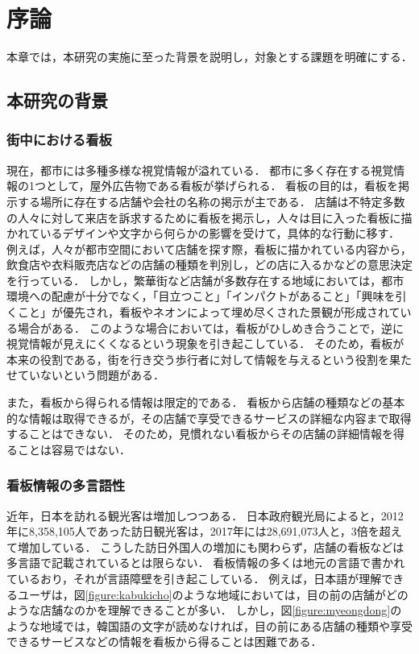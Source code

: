 \chapter{序論}
\label{chapter:introduction}

本章では，本研究の実施に至った背景を説明し，対象とする課題を明確にする．

\section{本研究の背景}
  \subsection{街中における看板}
  \label{subsection:signboards_in_town}
    現在，都市には多種多様な視覚情報が溢れている．
    都市に多く存在する視覚情報の1つとして，屋外広告物である看板が挙げられる．
    看板の目的は，看板を掲示する場所に存在する店舗や会社の名称の掲示が主である．
    店舗は不特定多数の人々に対して来店を訴求するために看板を掲示し，人々は目に入った看板に描かれているデザインや文字から何らかの影響を受けて，具体的な行動に移す\cite{Koyama:2016}．
    例えば，人々が都市空間において店舗を探す際，看板に描かれている内容から，飲食店や衣料販売店などの店舗の種類を判別し，どの店に入るかなどの意思決定を行っている．
    しかし，繁華街など店舗が多数存在する地域においては，都市環境への配慮が十分でなく，「目立つこと」「インパクトがあること」「興味を引くこと」が優先され，看板やネオンによって埋め尽くされた景観が形成されている場合がある\cite{Yokokawa:2000}．
    このような場合においては，看板がひしめき合うことで，逆に視覚情報が見えにくくなるという現象を引き起こしている\cite{Watanabe:2003}．
    そのため，看板が本来の役割である，街を行き交う歩行者に対して情報を与えるという役割を果たせていないという問題がある．

    また，看板から得られる情報は限定的である．
    看板から店舗の種類などの基本的な情報は取得できるが，その店舗で享受できるサービスの詳細な内容まで取得することはできない．
    そのため，見慣れない看板からその店舗の詳細情報を得ることは容易ではない．

  \subsection{看板情報の多言語性}
    近年，日本を訪れる観光客は増加しつつある．
    日本政府観光局によると，2012年に8,358,105人であった訪日観光客は，2017年には28,691,073人と，3倍を超えて増加している\cite{JNTO:2018}．
    こうした訪日外国人の増加にも関わらず，店舗の看板などは多言語で記載されているとは限らない．
    看板情報の多くは地元の言語で書かれているおり，それが言語障壁を引き起こしている．
    例えば，日本語が理解できるユーザは，図\ref{figure:kabukicho}のような地域においては，目の前の店舗がどのような店舗なのかを理解できることが多い．
    しかし，図\ref{figure:myeongdong}のような地域では，韓国語の文字が読めなければ，目の前にある店舗の種類や享受できるサービスなどの情報を看板から得ることは困難である．

